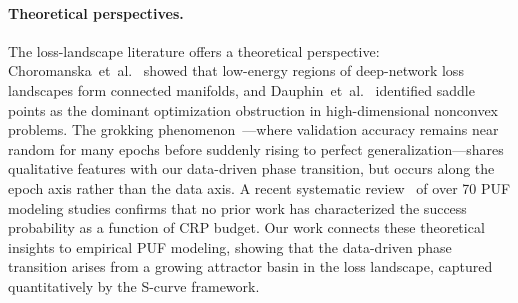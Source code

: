 \paragraph{Theoretical perspectives.}
The loss-landscape literature offers a theoretical perspective:
Choromanska~et~al.~\cite{choromanska2015loss}
showed that low-energy regions of deep-network loss landscapes form connected
manifolds, and Dauphin~et~al.~\cite{dauphin2014identifying}
identified saddle points as the dominant optimization obstruction in
high-dimensional nonconvex problems.  The grokking
phenomenon~\cite{power2022grokking}---where validation accuracy remains near
random for many epochs before suddenly rising to perfect
generalization---shares qualitative features with our data-driven
phase transition, but occurs along the epoch axis rather than the data axis.
A recent systematic review~\cite{pufmodeling2026systematic} of over 70
PUF modeling studies confirms that no prior work has characterized the
success probability as a function of CRP budget.  Our work connects these
theoretical insights to empirical PUF modeling, showing that the data-driven
phase transition arises from a growing attractor basin in the loss landscape,
captured quantitatively by the S-curve framework.


